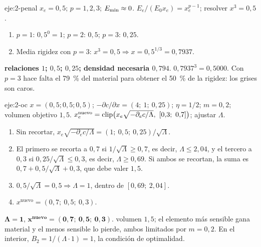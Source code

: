 \begin{solucion}{eje:2-penal}
\datos $x_e=0{,}5$; $p=1,2,3$; $E_{\min}\approx 0$.
\planteamiento $E_e/(E_0x_e)=x_e^{p-1}$; resolver $x^3=0{,}5$.
\pasos
\begin{enumerate}[label=\arabic*.]
  \item $p=1$: $0{,}5^0=1$; $p=2$: $0{,}5$; $p=3$: $0{,}25$.
  \item Media rigidez con $p=3$: $x^3=0{,}5\Rightarrow x=0{,}5^{1/3}=0{,}7937$.
\end{enumerate}
\resultado \textbf{relaciones $1$; $0{,}5$; $0{,}25$; densidad necesaria $0{,}794$}.
\comprobacion $0{,}7937^3=0{,}5000$. Con $p=3$ hace falta el 79~\% del material para obtener el 50~\% de la rigidez: los grises son caros.
\end{solucion}

\begin{solucion}{eje:2-oc}
\datos $x=(0{,}5;0{,}5;0{,}5)$; $-\partial c/\partial x=(4;\ 1;\ 0{,}25)$; $\eta=1/2$; $m=0{,}2$; volumen objetivo $1{,}5$.
\planteamiento $x_e^{\text{nuevo}}=\clip\bigl(x_e\sqrt{-\partial_ec/\Lambda},\ [0{,}3;\ 0{,}7]\bigr)$; ajustar $\Lambda$.
\pasos
\begin{enumerate}[label=\arabic*.]
  \item Sin recortar, $x_e\sqrt{-\partial_ec/\Lambda}=(1;\ 0{,}5;\ 0{,}25)/\sqrt\Lambda$.
  \item El primero se recorta a $0{,}7$ si $1/\sqrt\Lambda\ge 0{,}7$, es decir, $\Lambda\le 2{,}04$, y el tercero a $0{,}3$ si $0{,}25/\sqrt\Lambda\le 0{,}3$, es decir, $\Lambda\ge 0{,}69$. Si ambos se recortan, la suma es $0{,}7+0{,}5/\sqrt\Lambda+0{,}3$, que debe valer $1{,}5$.
  \item $0{,}5/\sqrt\Lambda=0{,}5\Rightarrow\Lambda=1$, dentro de $[0{,}69;\ 2{,}04]$.
  \item $x^{\text{nuevo}}=(0{,}7;\ 0{,}5;\ 0{,}3)$.
\end{enumerate}
\resultado $\mathbf{\Lambda=1}$, $\mathbf{x^{\text{nuevo}}=(0{,}7;\ 0{,}5;\ 0{,}3)}$.
\comprobacion volumen $1{,}5$; el elemento más sensible gana material y el menos sensible lo pierde, ambos limitados por $m=0{,}2$. En el interior, $B_2=1/(\Lambda\cdot 1)=1$, la condición de optimalidad.
\end{solucion}

